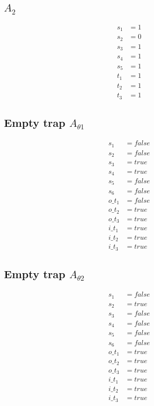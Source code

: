 \documentclass{scrartcl}
\begin{document}
\subsection{$A_2$}
\begin{align*}
  s_1 &= 1 \\
  s_2 &= 0 \\
  s_3 &= 1 \\
  s_4 &= 1 \\
  s_5 &= 1 \\
  t_1 &= 1 \\
  t_2 &= 1 \\
  t_3 &= 1
\end{align*}

\subsection{Empty trap $A_{\theta 1}$}
\begin{align*}
  s_1 &= false \\
  s_2 &= false \\
  s_3 &= true \\
  s_4 &= true \\
  s_5 &= false \\
  s_6 &= false \\
  o\_t_1 &= false \\
  o\_t_2 &= true \\
  o\_t_3 &= true \\
  i\_t_1 &= true \\
  i\_t_2 &= true \\
  i\_t_3 &= true
\end{align*}

\subsection{Empty trap $A_{\theta 2}$}
\begin{align*}
  s_1 &= false \\
  s_2 &= true \\
  s_3 &= false \\
  s_4 &= false \\
  s_5 &= false \\
  s_6 &= false \\
  o\_t_1 &= true \\
  o\_t_2 &= true \\
  o\_t_3 &= true \\
  i\_t_1 &= true \\
  i\_t_2 &= true \\
  i\_t_3 &= true
\end{align*}
\end{document}

